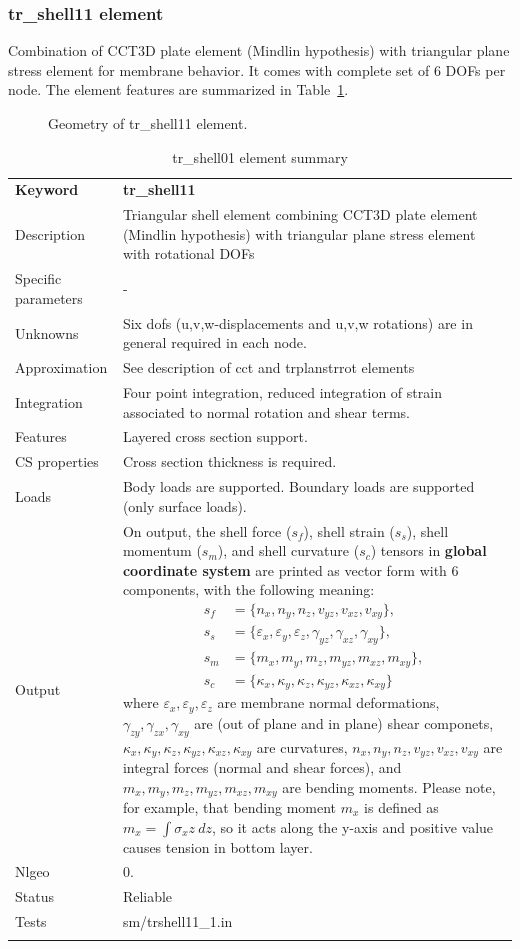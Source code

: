 \documentclass[a4paper]{article}
\newcommand{\param}[1]{\texttt{#1}} %
\newcommand{\templabel}{}%
\newcommand{\tempcaption}{}%
\newcounter{nelpar}
\newenvironment{elementsummary}[5]{%
  \gdef\tempcaption{#4}%
  \gdef\templabel{#5}%
  \setcounter{nelpar}{0}%
  \begin{center} %
    \begin{table}[!htb] %
      \begin{tabular}{|l|p{9cm}|}\hline %
        {\bf Keyword} & \bf{#1}\\ %
        {Description} & {#2}\\ %
        {Specific parameters} & {#3}\\ \hline %
}{
  \\ \hline %
      \end{tabular}%
      \caption{\tempcaption}%
      \label{\templabel}%
    \end{table}%
  \end{center}%
}
\newcommand{\elementParam}[1]{%
  \ifthenelse{\value{nelpar}>0} %
             {&{#1}}%
             {\setcounter{nelpar}{1}Parameters&{#1}}%
             \\%
}
\newcommand{\elementDescription}[2]{{#1} & {#2}\\}
\begin{document}
\subsubsection {tr\_shell11  element}
Combination of CCT3D plate element (Mindlin hypothesis) with triangular plane stress element
for membrane behavior. It comes with complete set of 6 DOFs per node. 
The element features are summarized in Table~\ref{trshell01summary}.
\begin{figure}[htb]
 \centering
 \begin{makeimage}
  
 \end{makeimage}
 \caption{Geometry of tr\_shell11 element.}
\end{figure}

\begin{elementsummary}{tr\_shell11}{Triangular shell element combining CCT3D plate element (Mindlin hypothesis) with triangular plane stress element with rotational DOFs}{-}{tr\_shell01 element summary}{trshell01summary}
\elementDescription{Unknowns}{Six dofs (u,v,w-displacements and u,v,w rotations) are in general required in each node.}
\elementDescription{Approximation}{See description of cct and trplanstrrot elements}
\elementDescription{Integration}{Four point integration, reduced integration of strain associated to normal rotation and shear terms.}
\elementDescription{Features}{Layered cross section support.}
\elementDescription{CS properties}{Cross section thickness is required.}
\elementDescription{Loads}{Body loads are supported. Boundary loads are supported (only surface loads).}
\elementDescription{Output}{On output, the shell force ($s_f$), shell strain ($s_s$), shell momentum ($s_m$), and shell curvature ($s_c$) tensors in \textbf{global coordinate system} are printed as vector form with 6 components, with the following meaning:
\begin{align*}
s_f &= \{n_x, n_y, n_z, v_{yz}, v_{xz}, v_{xy}\},\\
s_s &= \{\varepsilon_x, \varepsilon_y, \varepsilon_z, \gamma_{yz}, \gamma_{xz}, \gamma_{xy}\},\\
s_m &= \{m_x, m_y, m_z, m_{yz}, m_{xz}, m_{xy}\},\\
s_c &= \{\kappa_x, \kappa_y, \kappa_z, \kappa_{yz}, \kappa_{xz}, \kappa_{xy}\}
\end{align*}
where $\varepsilon_x, \varepsilon_y, \varepsilon_z$ are membrane normal deformations, $\gamma_{zy}, \gamma_{zx}, \gamma_{xy}$ are (out of plane and in plane) shear componets, $\kappa_x, \kappa_y, \kappa_z, \kappa_{yz}, \kappa_{xz}, \kappa_{xy}$ are curvatures, $n_x, n_y, n_z, v_{yz}, v_{xz}, v_{xy}$ are integral forces (normal and shear forces), and $m_x, m_y, m_z, m_{yz}, m_{xz}, m_{xy}$ are bending moments. 
Please note, for example, that bending moment $m_x$ is defined as $m_x=\int \sigma_x z\ dz$, so it acts along the y-axis and positive value causes tension in bottom layer.}
\elementDescription{Nlgeo}{0.}
\elementDescription{Status}{Reliable}
\elementDescription{Tests}{sm/trshell11\_1.in}
\end{elementsummary}
\end{document}
